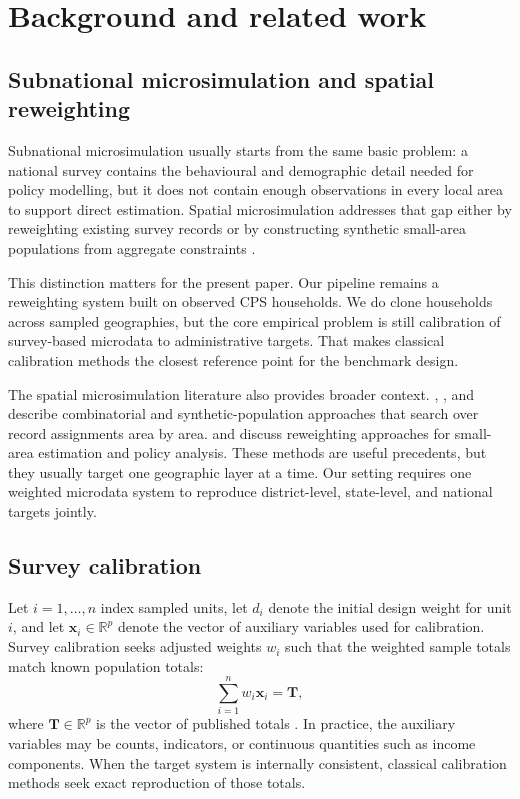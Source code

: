 \section{Background and related work}
\label{sec:background}

\subsection{Subnational microsimulation and spatial reweighting}

Subnational microsimulation usually starts from the same basic problem: a national survey contains
the behavioural and demographic detail needed for policy modelling, but it does not contain enough
observations in every local area to support direct estimation. Spatial microsimulation addresses
that gap either by reweighting existing survey records or by constructing synthetic small-area
populations from aggregate constraints \citep{tanton2014review, odonoghue2014review}.

This distinction matters for the present paper. Our pipeline remains a reweighting system built on
observed CPS households. We do clone households across sampled geographies, but the core empirical
problem is still calibration of survey-based microdata to administrative targets. That makes
classical calibration methods the closest reference point for the benchmark design.

The spatial microsimulation literature also provides broader context. \citet{williamson1998},
\citet{huang2001}, and \citet{harland2012} describe combinatorial and synthetic-population
approaches that search over record assignments area by area. \citet{tanton2011} and
\citet{lovelace2016} discuss reweighting approaches for small-area estimation and policy analysis.
These methods are useful precedents, but they usually target one geographic layer at a time. Our
setting requires one weighted microdata system to reproduce district-level, state-level, and
national targets jointly.

\subsection{Survey calibration}

Let $i = 1, \ldots, n$ index sampled units, let $d_i$ denote the initial design weight for unit
$i$, and let $\mathbf{x}_i \in \mathbb{R}^p$ denote the vector of auxiliary variables used for
calibration. Survey calibration seeks adjusted weights $w_i$ such that the weighted sample totals
match known population totals:
\begin{equation}
    \sum_{i=1}^{n} w_i \mathbf{x}_i = \mathbf{T},
    \label{eq:calibration_constraint}
\end{equation}
where $\mathbf{T} \in \mathbb{R}^p$ is the vector of published totals
\citep{deville1992, sarndal2007}. In practice, the auxiliary variables may be counts, indicators,
or continuous quantities such as income components. When the target system is internally
consistent, classical calibration methods seek exact reproduction of those totals.

